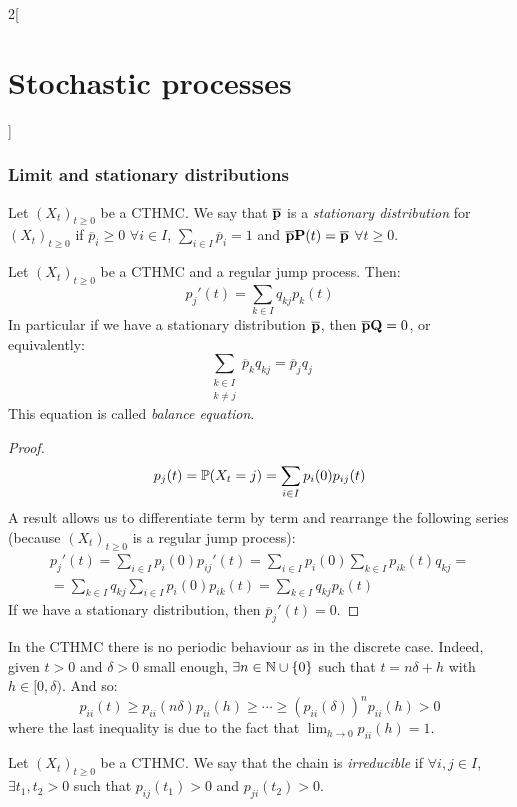 \documentclass[../../../main_math.tex]{subfiles}
\begin{document}
\begin{multicols}{2}[\section{Stochastic processes}]
  \subsubsection{Limit and stationary distributions}
  \begin{definition}
    Let ${(X_t)}_{t\geq 0}$ be a CTHMC. We say that $\boldsymbol{\mathrm{\overline{p}}}$ is a \emph{stationary distribution} for ${(X_t)}_{t\geq 0}$ if $\overline{p}_i\geq 0$ $\forall i\in I$, $\sum_{i\in I}\overline{p}_i =1$ and $\boldsymbol{\mathrm{\overline{p}}}\boldsymbol{\mathrm{P}}(t)=\boldsymbol{\mathrm{\overline{p}}}$ $\forall t\geq 0$.
  \end{definition}
  \begin{lemma}
    Let ${(X_t)}_{t\geq 0}$ be a CTHMC and a regular jump process. Then:
    $$
      {p_j}'(t)=\sum_{k\in I} q_{kj}p_k(t)
    $$
    In particular if we have a stationary distribution $\boldsymbol{\mathrm{\overline{p}}}$, then $\boldsymbol{\mathrm{\overline{p}}}\boldsymbol{\mathrm{Q}}=0$, or equivalently:
    $$
      \sum_{\substack{k\in I\\k\ne j}}\overline{p}_kq_{kj}=\overline{p}_jq_j
    $$
    This equation is called \emph{balance equation}.
  \end{lemma}
  \begin{proof}
    $$
      p_j(t) = \mathbb{P}(X_t=j) = \sum_{i\in I} p_i(0)p_{ij}(t)
    $$
    A result allows us to differentiate term by term and rearrange the following series (because ${(X_t)}_{t\geq 0}$ is a regular jump process):
    \begin{multline*}
      {p_j}'(t) = \sum_{i\in I} p_i(0){p_{ij}}'(t) = \sum_{i\in I} p_i(0)\sum_{k\in I}p_{ik}(t)q_{kj}  = \\= \sum_{k\in I}q_{kj}\sum_{i\in I}p_i(0)p_{ik}(t)=\sum_{k\in I}q_{kj}p_k(t)
    \end{multline*}
    If we have a stationary distribution, then ${\overline{p}_j}' (t)=0$.
  \end{proof}
  \begin{remark}
    In the CTHMC there is no periodic behaviour as in the discrete case. Indeed, given $t>0$ and $\delta>0$ small enough, $\exists n\in\mathbb{N}\cup\{0\}$ such that $t=n\delta +h$ with $h\in[0,\delta)$. And so:
    $$
      p_{ii}(t)\geq p_{ii}{(n\delta)} p_{ii}(h) \geq \cdots\geq {(p_{ii}(\delta))}^n p_{ii}(h)>0
    $$
    where the last inequality is due to the fact that $\displaystyle\lim_{h\to 0}p_{ii}(h)=1$.
  \end{remark}
  \begin{definition}
    Let ${(X_t)}_{t\geq 0}$ be a CTHMC. We say that the chain is \emph{irreducible} if $\forall i,j\in I$, $\exists t_1,t_2>0$ such that $p_{ij}(t_1)>0$ and $p_{ji}(t_2)>0$.

\end{definition}
\end{multicols}
\end{document}
